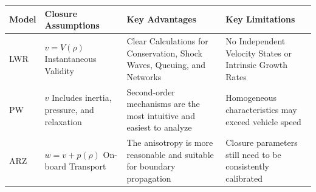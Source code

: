 \documentclass[11pt,a4paper,openany]{book}
\numberwithin{equation}{chapter}
\numberwithin{figure}{chapter}
\numberwithin{table}{chapter}
\begin{document}
\begin{center}
\small
{}
\label{tab:macro-model-hierarchy}
\begin{tabular}{p{2.0cm}p{4.0cm}p{4.1cm}p{4.0cm}}
\toprule







Model




&




 Closure Assumptions




&




 Key Advantages




&




 Key Limitations



\\
\midrule
LWR &




 $v=V(\rho)$ Instantaneous Validity




&




 Clear Calculations for Conservation, Shock Waves, Queuing, and Networks




&




 No Independent Velocity States or Intrinsic Growth Rates



\\
PW &




 $v$ Includes inertia, pressure, and relaxation




&




 Second-order mechanisms are the most intuitive and easiest to analyze




&




 Homogeneous characteristics may exceed vehicle speed\\
ARZ & $w=v+p(\rho)$ On-board Transport




&




 The anisotropy is more reasonable and suitable for boundary propagation




&




 Closure parameters still need to be consistently calibrated



\\
\bottomrule
\end{tabular}
\end{center}
\end{document}
